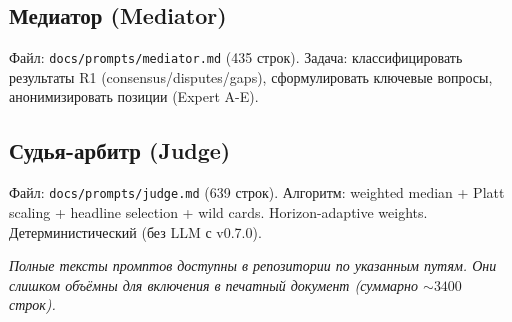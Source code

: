\subsection{Медиатор (Mediator)}
\label{app:prompt_mediator}
Файл: \texttt{docs/prompts/mediator.md} (435 строк).
Задача: классифицировать результаты R1 (consensus/disputes/gaps),
сформулировать ключевые вопросы, анонимизировать позиции (Expert A-E).

\subsection{Судья-арбитр (Judge)}
\label{app:prompt_judge}
Файл: \texttt{docs/prompts/judge.md} (639 строк).
Алгоритм: weighted median + Platt scaling + headline selection + wild cards.
Horizon-adaptive weights. Детерминистический (без LLM с v0.7.0).

\bigskip
\noindent\emph{Полные тексты промптов доступны в репозитории по указанным путям.
Они слишком объёмны для включения в печатный документ (суммарно ${\sim}3400$ строк).}
